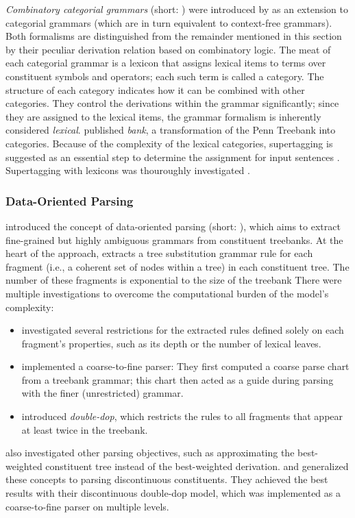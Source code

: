 \documentclass[../document.tex]{subfiles}
\begin{document}
    \emph{Combinatory categorial grammars} (short: ) were introduced by \citet{Ste11} as an extension to categorial grammars (which are in turn equivalent to context-free grammars).
    Both formalisms are distinguished from the remainder mentioned in this section by their peculiar derivation relation based on combinatory logic.
    The meat of each categorial grammar is a lexicon that assigns lexical items to terms over constituent symbols and operators; each such term is called a category.
    The structure of each category indicates how it can be combined with other categories.
    They control the derivations within the grammar significantly; since they are assigned to the lexical items, the grammar formalism is inherently considered \emph{lexical}.
     published \emph{ bank}, a transformation of the Penn Treebank into  categories.
    Because of the complexity of the lexical categories, supertagging is suggested as an essential step to determine the assignment for input sentences \citep{Clark04}.
    Supertagging with  lexicons was thouroughly investigated \citep{clark2002supertagging, LewisSteedman14, vaswani2016supertagging, Kad18, StaSte20}.

    \subsubsection*{Data-Oriented Parsing}
     introduced the concept of data-oriented parsing (short: ), which aims to extract fine-grained but highly ambiguous grammars from constituent treebanks.
    At the heart of the approach, \citeauthor{Bod92} extracts a tree substitution grammar rule for each fragment (i.e.\@, a coherent set of nodes within a tree) in each constituent tree.
    The number of these fragments is exponential to the size of the treebank
    There were multiple investigations to overcome the computational burden of the model's complexity:
    \begin{itemize}
        \item \citet{Bod01} investigated several restrictions for the extracted rules defined solely on each fragment's properties, such as its depth or the number of lexical leaves.
        \item \citet{Ban10} implemented a coarse-to-fine parser:
            They first computed a coarse parse chart from a treebank grammar; this chart then acted as a guide during parsing with the finer (unrestricted)  grammar.
        \item \citet{San11} introduced \emph{double-dop}, which restricts the rules to all fragments that appear at least twice in the treebank.
    \end{itemize}
     also investigated other parsing objectives, such as approximating the best-weighted constituent tree instead of the best-weighted derivation.
     and \cite{CraSchBod16} generalized these concepts to parsing discontinuous constituents.
    They achieved the best results with their discontinuous double-dop model, which was implemented as a coarse-to-fine parser on multiple levels.
\end{document}
